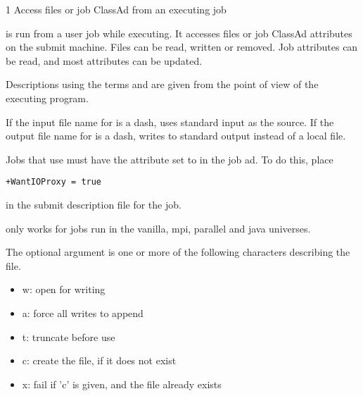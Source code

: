 \begin{ManPage}{\label{man-condor-chirp}}{1}
{Access files or job ClassAd from an executing job}
\Synopsis
{}

  

    

 

 

  

 

\Description 
{}
 is run from a user job while executing.
It accesses files or job ClassAd attributes on the submit machine.
Files can be read, written or removed.
Job attributes can be read, and most attributes can be updated.

Descriptions using the terms  and 
are given from the point of view of the executing program.

If the input file name for  is a dash,
 uses standard input as the source.
If the output file name for  is a dash,
 writes to standard output instead of a local file.

Jobs that use  must have the attribute
 set to  in the job ad.
To do this, place
\begin{verbatim}
+WantIOProxy = true
\end{verbatim}
in the submit description file for the job.

 only works for jobs run in the
vanilla, mpi, parallel and java universes.

The optional  argument
is one or more of the following characters describing the
 file.
  \begin{itemize}
    \item{w:  open for writing}
    \item{a:  force all writes to append}
    \item{t:  truncate before use}
    \item{c:  create the file, if it does not exist}
    \item{x:  fail if 'c' is given, and the file already exists}
  \end{itemize}


\end{ManPage}
